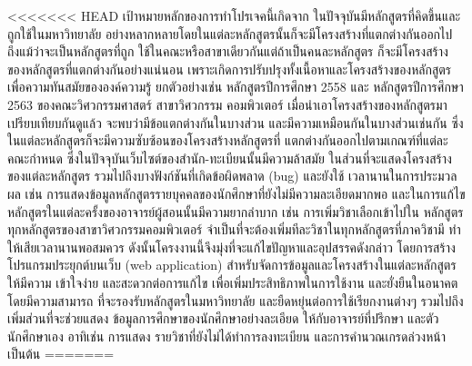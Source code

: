 \maketitle
\makesignature

\ifproject
\begin{abstractTH}
<<<<<<< HEAD
    เป้าหมายหลักของการทําโปรเจคนี้เกิดจาก ในปัจจุบันมีหลักสูตรที่คิดขึ้นและถูกใช้ในมหาวิทยาลัย
    อย่างหลากหลายโดยในแต่ละหลักสูตรนั้นก็จะมีโครงสร้างที่แตกต่างกันออกไป ถึงแม้ว่าจะเป็นหลักสูตรที่ถูก
    ใช้ในคณะหรือสาขาเดียวกันแต่ถ้าเป็นคนละหลักสูตร ก็จะมีโครงสร้างของหลักสูตรที่แตกต่างกันอย่างแน่นอน
    เพราะเกิดการปรับปรุงทั้งเนื้อหาและโครงสร้างของหลักสูตรเพื่อความทันสมัยขององค์ความรู้ ยกตัวอย่างเช่น 
    หลักสูตรปีการศึกษา 2558 และ หลักสูตรปีการศึกษา 2563 ของคณะวิศวกรรมศาสตร์ สาขาวิศวกรรม
    คอมพิวเตอร์ เมื่อนําเอาโครงสร้างของหลักสูตรมาเปรียบเทียบกันดูแล้ว จะพบว่ามีข้อแตกต่างกันในบางส่วน 
    และมีความเหมือนกันในบางส่วนเช่นกัน ซึ่งในแต่ละหลักสูตรก็จะมีความซับซ้อนของโครงสร้างหลักสูตรที่
    แตกต่างกันออกไปตามเกณฑ์ที่แต่ละคณะกําหนด ซึ่งในปัจจุบันเว็บไซต์ของสํานัก-ทะเบียนนั้นมีความล้าสมัย
    ในส่วนที่จะแสดงโครงสร้างของแต่ละหลักสูตร รวมไปถึงบางฟังก์ชันที่เกิดข้อผิดพลาด (bug) และยังใช้
    เวลานานในการประมวลผล เช่น การแสดงข้อมูลหลักสูตรรายบุคคลของนักศึกษาที่ยังไม่มีความละเอียดมากพอ 
    และในการแก้ไขหลักสูตรในแต่ละครั้งของอาจารย์ผู้สอนนั้นมีความยากลําบาก เช่น การเพิ่มวิชาเลือกเข้าไปใน
    หลักสูตรทุกหลักสูตรของสาขาวิศวกรรมคอมพิวเตอร์ จําเป็นที่จะต้องเพิ่มทีละวิชาในทุกหลักสูตรที่ภาควิชามี 
    ทําให้เสียเวลานานพอสมควร ดังนั้นโครงงานนี้จึงมุ่งที่จะแก้ไขปัญหาและอุปสรรคดังกล่าว โดยการสร้าง
    โปรแกรมประยุกต์บนเว็บ (web application) สําหรับจัดการข้อมูลและโครงสร้างในแต่ละหลักสูตรให้มีความ
    เข้าใจง่าย และสะดวกต่อการแก้ไข เพื่อเพิ่มประสิทธิภาพในการใช้งาน และยั่งยืนในอนาคต โดยมีความสามารถ
    ที่จะรองรับหลักสูตรในมหาวิทยาลัย และยืดหยุ่นต่อการใช้เรียกงานต่างๆ รวมไปถึงเพิ่มส่วนที่จะช่วยแสดง
    ข้อมูลการศึกษาของนักศึกษาอย่างละเอียด ให้กับอาจารย์ที่ปรึกษา และตัวนักศึกษาเอง อาทิเช่น การแสดง
    รายวิชาที่ยังไม่ได้ทําการลงทะเบียน และการคํานวณเกรดล่วงหน้า เป็นต้น 
=======


\end{abstractTH}
